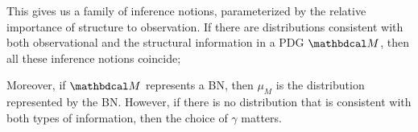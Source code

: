\documentclass[twoside]{article}
\newcommand\discard[1]{}
\begin{document}
{{}
This gives us a family of inference notions, parameterized
by the relative importance of structure to observation.
If there are distributions
consistent with
both observational and the structural information in
a PDG $\dg M$, then all these inference notions coincide; 
\discard{\color{red} 
    that is, 
    there is a
    single distribution $\Pr_{\dg M}$ that minimizes both loss functions, 
    in which case we want to answer queries with respect to $\Pr_{\dg M}$
    no matter how we weight observational and structural information. 
}
Moreover, if $\dg M$ represents a BN,
then $\mu_M$ is the distribution represented by the BN.  
However, if there is no
distribution that is consistent with both types of information, then
the choice of $\gamma$ matters.  
}
\end{document}
